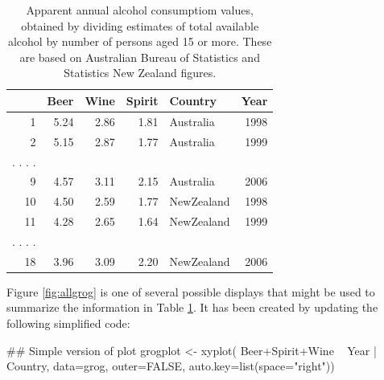 \begin{table}
\begin{center}
\caption{Apparent annual alcohol consumptiom values, obtained by dividing
    estimates of total available alcohol by number of persons aged 15
    or more. These are based on Australian Bureau of Statistics
    and Statistics New Zealand figures.\label{tab:grog}}
\begin{tabular}{rrrrlr}
  \hline
 & Beer & Wine & Spirit & Country & Year \\
  \hline
1 & 5.24 & 2.86 & 1.81 & Australia & 1998 \\
  2 & 5.15 & 2.87 & 1.77 & Australia & 1999 \\
. . . .\\
  9 & 4.57 & 3.11 & 2.15 & Australia & 2006 \\
  10 & 4.50 & 2.59 & 1.77 & NewZealand & 1998 \\
  11 & 4.28 & 2.65 & 1.64 & NewZealand & 1999 \\
. . . .\\
  18 & 3.96 & 3.09 & 2.20 & NewZealand & 2006 \\
   \hline
\end{tabular}
\end{center}
\end{table}

Figure \ref{fig:allgrog} is one of several possible displays that
might be used to summarize the information in Table \ref{tab:grog}.
It has been created by updating the following simplified code:
\noindent
\begin{Schunk}
\begin{Sinput}
## Simple version of plot
grogplot <- xyplot(
              Beer+Spirit+Wine ~ Year | Country,
              data=grog, outer=FALSE,
              auto.key=list(space="right"))
\end{Sinput}
\end{Schunk}


